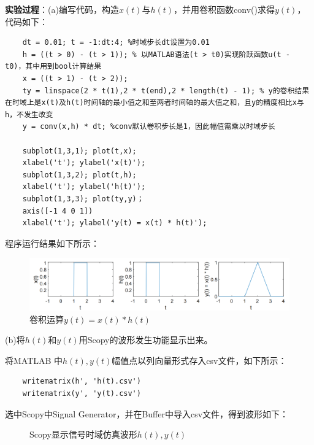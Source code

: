 \documentclass[12pt]{article}
\begin{document}
\textbf{实验过程}：(a)编写代码，构造$x(t)$与$h(t)$，并用卷积函数conv()求得$y(t)$，代码如下：
\begin{lstlisting}
    dt = 0.01; t = -1:dt:4; %时域步长dt设置为0.01
    h = ((t > 0) - (t > 1)); % 以MATLAB语法(t > t0)实现阶跃函数u(t - t0)，其中用到bool计算结果
    x = ((t > 1) - (t > 2));
    ty = linspace(2 * t(1),2 * t(end),2 * length(t) - 1); % y的卷积结果在时域上是x(t)及h(t)时间轴的最小值之和至两者时间轴的最大值之和，且y的精度相比x与h，不发生改变
    y = conv(x,h) * dt; %conv默认卷积步长是1，因此幅值需乘以时域步长
    
    subplot(1,3,1); plot(t,x);
    xlabel('t'); ylabel('x(t)');
    subplot(1,3,2); plot(t,h);
    xlabel('t'); ylabel('h(t)');
    subplot(1,3,3); plot(ty,y)；
    axis([-1 4 0 1])
    xlabel('t'); ylabel('y(t) = x(t) * h(t)');
\end{lstlisting}
程序运行结果如下所示：
\begin{figure}[H]
    \centering
    \includegraphics[scale=0.27]{conv1.png}
    \caption{卷积运算$y(t) = x(t) * h(t)$}
    \label{conv_a}
\end{figure}

(b)将$h(t)$和$y(t)$用Scopy的波形发生功能显示出来。

将MATLAB 中$h(t),y(t)$幅值点以列向量形式存入csv文件，如下所示：
\begin{lstlisting}
    writematrix(h', 'h(t).csv')
    writematrix(y', 'y(t).csv')
\end{lstlisting}
选中Scopy中Signal Generator，并在Buffer中导入csv文件，得到波形如下：
\begin{figure}[H]
    \centering
    
     \hspace{0.005\linewidth}
       
    \caption{Scopy显示信号时域仿真波形$h(t),y(t)$}
  \label{示波器2a(2)}
\end{figure}
\end{document}
